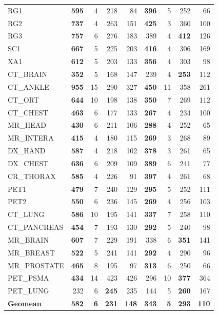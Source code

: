 \documentclass[journal]{IEEEtran}
\begin{document}
\begin{table}[htbp]
\begin{tabular}{l|rrrr|rrrr}
RG1            & \textbf{595} & 4 & 218 & 84 & \textbf{396} & 5 & 252 & 66 \\
RG2            & \textbf{737} & 4 & 263 & 151 & \textbf{425} & 3 & 360 & 100 \\
RG3            & \textbf{757} & 6 & 276 & 183 & 389 & 4 & \textbf{412} & 126 \\
SC1            & \textbf{667} & 5 & 225 & 203 & \textbf{416} & 4 & 306 & 169 \\
XA1            & \textbf{612} & 5 & 203 & 133 & \textbf{356} & 4 & 303 & 98 \\
CT\_BRAIN      & \textbf{352} & 5 & 168 & 147 & 239 & 4 & \textbf{253} & 112 \\
CT\_ANKLE      & \textbf{955} & 15 & 290 & 327 & \textbf{450} & 11 & 358 & 261 \\
CT\_ORT        & \textbf{644} & 10 & 198 & 138 & \textbf{350} & 7 & 269 & 112 \\
CT\_CHEST      & \textbf{463} & 6 & 177 & 133 & \textbf{267} & 4 & 234 & 100 \\
MR\_HEAD       & \textbf{430} & 6 & 211 & 106 & \textbf{288} & 4 & 252 & 65 \\
MR\_INTERA     & \textbf{415} & 4 & 180 & 115 & \textbf{269} & 3 & 268 & 89 \\
DX\_HAND       & \textbf{587} & 4 & 218 & 102 & \textbf{378} & 3 & 261 & 65 \\
DX\_CHEST      & \textbf{636} & 6 & 209 & 109 & \textbf{389} & 6 & 241 & 77 \\
CR\_THORAX     & \textbf{585} & 4 & 226 & 91 & \textbf{397} & 4 & 261 & 68 \\
PET1           & \textbf{479} & 7 & 240 & 129 & \textbf{295} & 5 & 252 & 111 \\
PET2           & \textbf{550} & 6 & 236 & 145 & \textbf{269} & 4 & 256 & 103 \\
CT\_LUNG       & \textbf{586} & 10 & 195 & 141 & \textbf{337} & 7 & 258 & 110 \\
CT\_PANCREAS   & \textbf{454} & 7 & 193 & 130 & \textbf{292} & 5 & 240 & 98 \\
MR\_BRAIN      & \textbf{607} & 7 & 229 & 191 & 338 & 6 & \textbf{351} & 141 \\
MR\_BREAST     & \textbf{522} & 5 & 241 & 141 & \textbf{292} & 4 & 290 & 96 \\
MR\_PROSTATE   & \textbf{465} & 8 & 195 & 97 & \textbf{313} & 6 & 250 & 66 \\
PET\_PSMA      & \textbf{434} & 14 & 423 & 426 & 296 & 10 & \textbf{377} & 364 \\
PET\_LUNG      & 232 & 6 & \textbf{245} & 235 & 144 & 5 & \textbf{260} & 167 \\
\midrule
\textbf{Geomean} & \textbf{582} & \textbf{6} & \textbf{231} & \textbf{148} & \textbf{343} & \textbf{5} & \textbf{293} & \textbf{110} \\
\bottomrule
\end{tabular}
\end{table}
\end{document}
